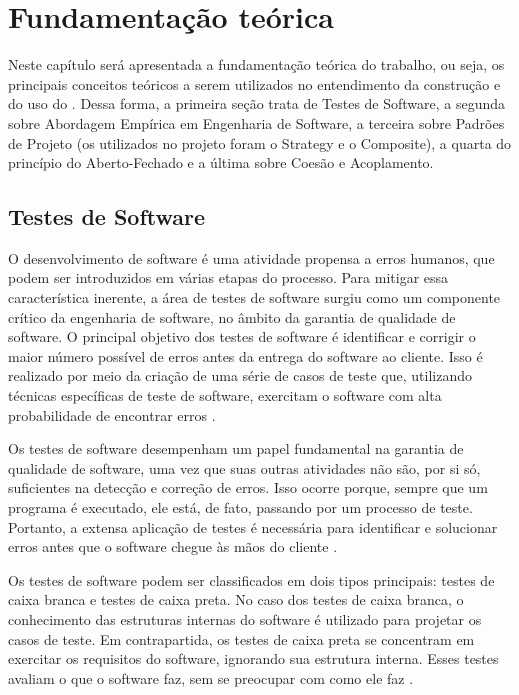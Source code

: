 \documentclass[12pt]{tcc}
\begin{document}
\chapter{Fundamentação teórica}
	\label{cap:fundamentacao_teorica}

		Neste capítulo será apresentada a fundamentação teórica do trabalho, ou seja, os principais conceitos teóricos a serem utilizados no entendimento da construção e do uso do . Dessa forma, a primeira seção trata de Testes de Software, a segunda sobre Abordagem Empírica em Engenharia de Software, a terceira sobre Padrões de Projeto (os utilizados no projeto foram o Strategy e o Composite), a quarta do princípio do Aberto-Fechado e a última sobre Coesão e Acoplamento.

		\section{Testes de Software}
		\label{cap:software-testing}
		O desenvolvimento de software é uma atividade propensa a erros humanos, que podem ser introduzidos em várias etapas do processo.
		Para mitigar essa característica inerente, a área de testes de software surgiu como um componente crítico da engenharia de software, no âmbito da garantia de qualidade de software.
		O principal objetivo dos testes de software é identificar e corrigir o maior número possível de erros antes da entrega do software ao cliente.
		Isso é realizado por meio da criação de uma série de casos de teste que, utilizando técnicas específicas de teste de software, exercitam o software com alta probabilidade de encontrar erros \citep{pressman2009software}.

		Os testes de software desempenham um papel fundamental na garantia de qualidade de software, uma vez que suas outras atividades não são, por si só, suficientes na detecção e correção de erros.
		Isso ocorre porque, sempre que um programa é executado, ele está, de fato, passando por um processo de teste.
		Portanto, a extensa aplicação de testes é necessária para identificar e solucionar erros antes que o software chegue às mãos do cliente \citep{pressman2009software}.

		Os testes de software podem ser classificados em dois tipos principais: testes de caixa branca e testes de caixa preta.
		No caso dos testes de caixa branca, o conhecimento das estruturas internas do software é utilizado para projetar os casos de teste.
		Em contrapartida, os testes de caixa preta se concentram em exercitar os requisitos do software, ignorando sua estrutura interna. Esses testes avaliam o que o software faz, sem se preocupar com como ele faz \citep{pressman2009software}.
\end{document}
